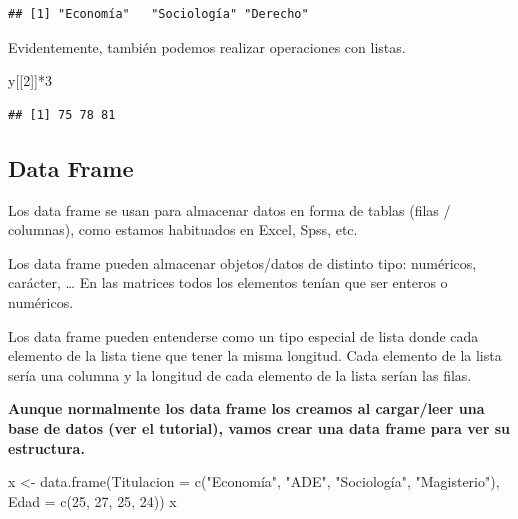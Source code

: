 \documentclass[
]{book}
\newenvironment{Shaded}{\begin{snugshade}}{\end{snugshade}}
\newcommand{\AttributeTok}[1]{\textcolor[rgb]{0.77,0.63,0.00}{#1}}
\newcommand{\DecValTok}[1]{\textcolor[rgb]{0.00,0.00,0.81}{#1}}
\newcommand{\FunctionTok}[1]{\textcolor[rgb]{0.00,0.00,0.00}{#1}}
\newcommand{\NormalTok}[1]{#1}
\newcommand{\OtherTok}[1]{\textcolor[rgb]{0.56,0.35,0.01}{#1}}
\newcommand{\SpecialCharTok}[1]{\textcolor[rgb]{0.00,0.00,0.00}{#1}}
\newcommand{\StringTok}[1]{\textcolor[rgb]{0.31,0.60,0.02}{#1}}
\begin{document}
\begin{verbatim}
## [1] "Economía"   "Sociología" "Derecho"
\end{verbatim}

Evidentemente, también podemos realizar operaciones con listas.

\begin{Shaded}
\begin{Highlighting}[]
\NormalTok{y[[}\DecValTok{2}\NormalTok{]]}\SpecialCharTok{*}\DecValTok{3}
\end{Highlighting}
\end{Shaded}

\begin{verbatim}
## [1] 75 78 81
\end{verbatim}

\hypertarget{data-frame}{%
\subsection{Data Frame}\label{data-frame}}

Los data frame se usan para almacenar datos en forma de tablas (filas / columnas), como estamos habituados en Excel, Spss, etc.

Los data frame pueden almacenar objetos/datos de distinto tipo: numéricos, carácter, \ldots{} En las matrices todos los elementos tenían que ser enteros o numéricos.

Los data frame pueden entenderse como un tipo especial de lista donde cada elemento de la lista tiene que tener la misma longitud. Cada elemento de la lista sería una columna y la longitud de cada elemento de la lista serían las filas.

\textbf{Aunque normalmente los data frame los creamos al cargar/leer una base de datos (ver el tutorial), vamos crear una data frame para ver su estructura.}

\begin{Shaded}
\begin{Highlighting}[]
\NormalTok{x }\OtherTok{\textless{}{-}} \FunctionTok{data.frame}\NormalTok{(}\AttributeTok{Titulacion =} \FunctionTok{c}\NormalTok{(}\StringTok{"Economía"}\NormalTok{, }\StringTok{"ADE"}\NormalTok{, }\StringTok{"Sociología"}\NormalTok{, }\StringTok{"Magisterio"}\NormalTok{), }\AttributeTok{Edad =} \FunctionTok{c}\NormalTok{(}\DecValTok{25}\NormalTok{, }\DecValTok{27}\NormalTok{, }\DecValTok{25}\NormalTok{, }\DecValTok{24}\NormalTok{))}
\NormalTok{x}
\end{Highlighting}
\end{Shaded}
\end{document}
